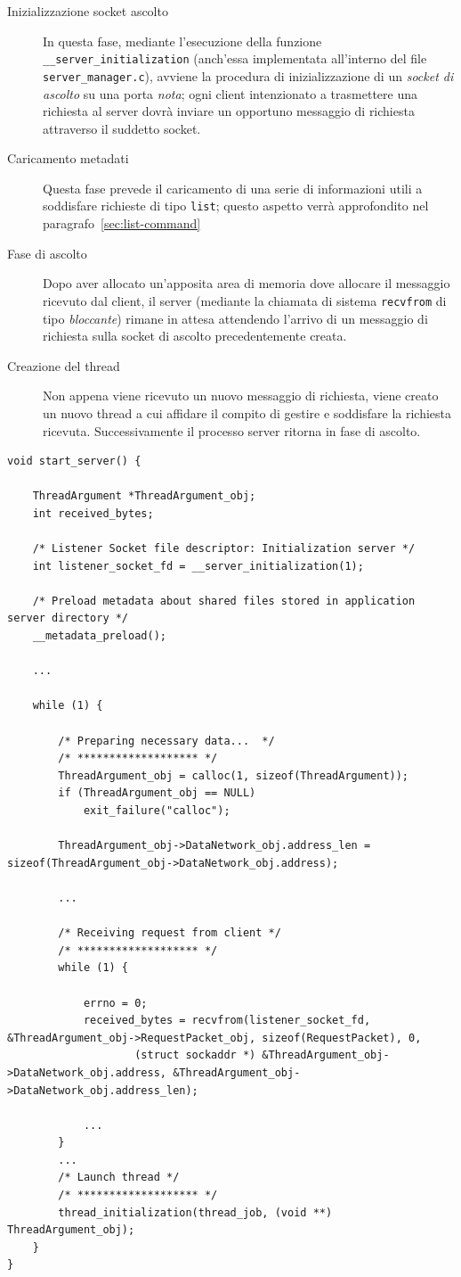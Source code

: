 \documentclass[10pt,a4paper, titlepage]{report}
\begin{document}
\begin{description}
\item[Inizializzazione socket ascolto] In questa fase, mediante l'esecuzione della funzione \texttt{\_\_server\_initialization} (anch'essa implementata all'interno del file \texttt{server\_manager.c}), avviene la procedura di inizializzazione di un \textit{socket di ascolto} su una porta \textit{nota}; ogni client intenzionato a trasmettere una richiesta al server dovrà inviare un opportuno messaggio di richiesta attraverso il suddetto socket.
\item[Caricamento metadati] Questa fase prevede il caricamento di una serie di informazioni utili a soddisfare richieste di tipo \texttt{list}; questo aspetto verrà approfondito nel paragrafo~\ref{sec:list-command}
\item[Fase di ascolto] Dopo aver allocato un'apposita area di memoria dove allocare il messaggio ricevuto dal client, il server (mediante la chiamata di sistema \texttt{recvfrom} di tipo \textit{bloccante}) rimane in attesa attendendo l'arrivo di un messaggio di richiesta sulla socket di ascolto precedentemente creata.
\item[Creazione del thread] Non appena viene ricevuto un nuovo messaggio di richiesta, viene creato un nuovo thread a cui affidare il compito di gestire e soddisfare la richiesta ricevuta. Successivamente il processo server ritorna in fase di ascolto.

\end{description}

\begin{lstlisting}[frame=lines, caption={Implementazione della funzione \texttt{start\_server}}, label={code:serverStart}]
void start_server() {

	ThreadArgument *ThreadArgument_obj;
	int received_bytes;

	/* Listener Socket file descriptor: Initialization server */
	int listener_socket_fd = __server_initialization(1);

	/* Preload metadata about shared files stored in application server directory */
	__metadata_preload();

	...

	while (1) {

		/* Preparing necessary data...  */
		/* ******************* */
		ThreadArgument_obj = calloc(1, sizeof(ThreadArgument));
		if (ThreadArgument_obj == NULL)
			exit_failure("calloc");

		ThreadArgument_obj->DataNetwork_obj.address_len = sizeof(ThreadArgument_obj->DataNetwork_obj.address);

		...

		/* Receiving request from client */
		/* ******************* */
		while (1) {

			errno = 0;
			received_bytes = recvfrom(listener_socket_fd, &ThreadArgument_obj->RequestPacket_obj, sizeof(RequestPacket), 0,
					(struct sockaddr *) &ThreadArgument_obj->DataNetwork_obj.address, &ThreadArgument_obj->DataNetwork_obj.address_len);

			...
		}
		...
		/* Launch thread */
		/* ******************* */
		thread_initialization(thread_job, (void **) ThreadArgument_obj);
	}
}
\end{lstlisting}
\end{document}

